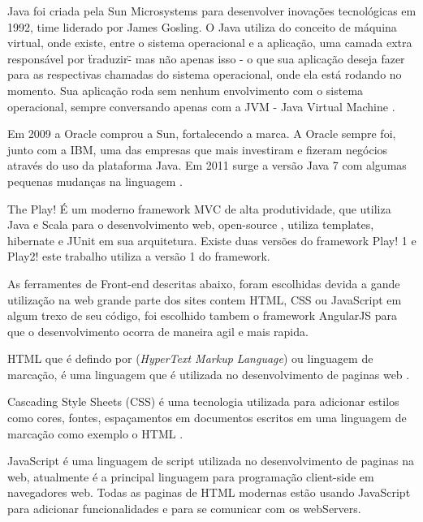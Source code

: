 Java foi criada pela Sun Microsystems para desenvolver inovações tecnológicas em 1992, time liderado por James Gosling. O Java utiliza do conceito de máquina virtual, onde existe, entre o sistema operacional e a aplicação, uma camada extra responsável por \"traduzir\" - mas não apenas isso - o que sua aplicação deseja fazer para as respectivas chamadas do sistema operacional, onde ela está rodando no momento. Sua aplicação roda sem nenhum envolvimento com o sistema operacional, sempre conversando apenas com a JVM - Java Virtual Machine \cite{caelum}.\par

Em 2009 a Oracle comprou a Sun, fortalecendo a marca. A Oracle sempre foi, junto com a IBM, uma das empresas que mais investiram e fizeram negócios através do uso da plataforma Java. Em 2011 surge a versão Java 7 com algumas pequenas mudanças na linguagem \cite{caelum}.\par


The Play! É um moderno framework MVC de alta produtividade, que utiliza Java e Scala para o desenvolvimento web, open-source , utiliza templates, hibernate e JUnit  em sua arquitetura. Existe duas versões do framework Play! 1 e Play2! este trabalho utiliza a versão 1 do framework\cite{playframework}.\par



As ferramentes de Front-end descritas abaixo, foram escolhidas devida a gande utilização na web grande parte dos sites contem HTML, CSS ou JavaScript em algum trexo de seu código, foi escolhido tambem o framework AngularJS para que o desenvolvimento ocorra de maneira agil e mais rapida.\par

HTML que é defindo por (\textit{HyperText Markup Language}) ou linguagem de marcação, é uma linguagem que é utilizada no desenvolvimento de paginas web \cite{html}.\par

Cascading Style Sheets (CSS) é uma tecnologia utilizada para adicionar estilos como cores, fontes, espaçamentos em documentos escritos em uma linguagem de marcação como exemplo o HTML \cite{css}.\par


JavaScript é uma linguagem de script utilizada no desenvolvimento de paginas na web, atualmente é a principal linguagem para programação client-side em navegadores web. Todas as paginas de HTML modernas estão usando JavaScript para adicionar funcionalidades e para se comunicar com os webServers\cite{javascript}.\par

